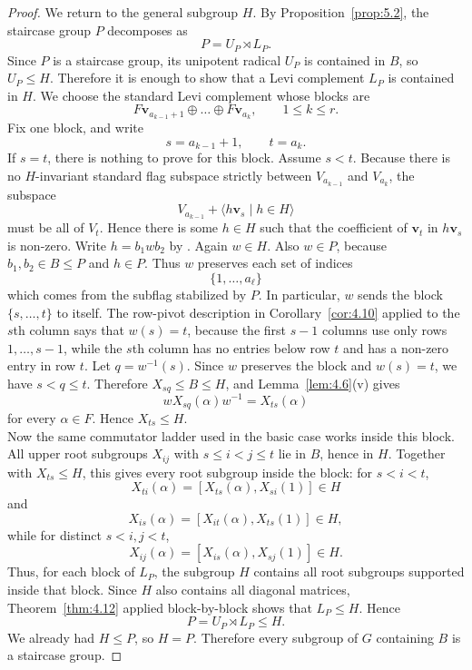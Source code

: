 \documentclass[../Odyssey_Project.tex]{subfiles}
\begin{document}
\begin{proof}
We return to the general subgroup $H$. By Proposition~\ref{prop:5.2}, the staircase group $P$ decomposes as
\[
    P=U_P\rtimes L_P.
\]
Since $P$ is a staircase group, its unipotent radical $U_P$ is contained in $B$, so $U_P\leq H$. Therefore it is enough to show that a Levi complement $L_P$ is contained in $H$. We choose the standard Levi complement whose blocks are
\[
    F\mathbf{v}_{a_{k-1}+1}\oplus\dots\oplus F\mathbf{v}_{a_k},
    \qquad
    1\leq k\leq r.
\]
Fix one block, and write
\[
    s=a_{k-1}+1,
    \qquad
    t=a_k.
\]
If $s=t$, there is nothing to prove for this block. Assume $s<t$. Because there is no $H$-invariant standard flag subspace strictly between $V_{a_{k-1}}$ and $V_{a_k}$, the subspace
\[
    V_{a_{k-1}}+\langle h\mathbf{v}_s\mid h\in H\rangle
\]
must be all of $V_t$. Hence there is some $h\in H$ such that the coefficient of $\mathbf{v}_t$ in $h\mathbf{v}_s$ is non-zero. Write $h=b_1wb_2$ by . Again $w\in H$. Also $w\in P$, because $b_1,b_2\in B\leq P$ and $h\in P$. Thus $w$ preserves each set of indices
\[
    \{1,\dots,a_\ell\}
\]
which comes from the subflag stabilized by $P$. In particular, $w$ sends the block $\{s,\dots,t\}$ to itself. The row-pivot description in Corollary~\ref{cor:4.10} applied to the $s$th column says that $w(s)=t$, because the first $s-1$ columns use only rows $1,\dots,s-1$, while the $s$th column has no entries below row $t$ and has a non-zero entry in row $t$. Let $q=w^{-1}(s)$. Since $w$ preserves the block and $w(s)=t$, we have $s<q\leq t$. Therefore $X_{sq}\leq B\leq H$, and Lemma~\ref{lem:4.6}(v) gives
\[
    wX_{sq}(\alpha)w^{-1}=X_{ts}(\alpha)
\]
for every $\alpha\in F$. Hence $X_{ts}\leq H$.\\
Now the same commutator ladder used in the basic case works inside this block. All upper root subgroups $X_{ij}$ with $s\leq i<j\leq t$ lie in $B$, hence in $H$. Together with $X_{ts}\leq H$, this gives every root subgroup inside the block: for $s<i<t$,
\[
    X_{ti}(\alpha)=[X_{ts}(\alpha),X_{si}(1)]\in H
\]
and
\[
    X_{is}(\alpha)=[X_{it}(\alpha),X_{ts}(1)]\in H,
\]
while for distinct $s<i,j<t$,
\[
    X_{ij}(\alpha)=[X_{is}(\alpha),X_{sj}(1)]\in H.
\]
Thus, for each block of $L_P$, the subgroup $H$ contains all root subgroups supported inside that block. Since $H$ also contains all diagonal matrices, Theorem~\ref{thm:4.12} applied block-by-block shows that $L_P\leq H$. Hence
\[
    P=U_P\rtimes L_P\leq H.
\]
We already had $H\leq P$, so $H=P$. Therefore every subgroup of $G$ containing $B$ is a staircase group.
\end{proof}
\end{document}
